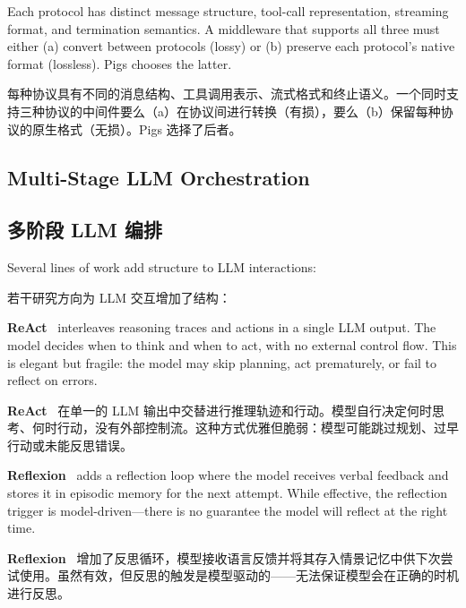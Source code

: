 Each protocol has distinct message structure, tool-call representation, streaming format, and termination semantics. A middleware that supports all three must either (a) convert between protocols (lossy) or (b) preserve each protocol's native format (lossless). Pigs chooses the latter.
\begin{chinese}
每种协议具有不同的消息结构、工具调用表示、流式格式和终止语义。一个同时支持三种协议的中间件要么（a）在协议间进行转换（有损），要么（b）保留每种协议的原生格式（无损）。Pigs 选择了后者。
\end{chinese}

\subsection{Multi-Stage LLM Orchestration}
\begin{chinese}
\subsection{多阶段 LLM 编排}
\end{chinese}

Several lines of work add structure to LLM interactions:
\begin{chinese}
若干研究方向为 LLM 交互增加了结构：
\end{chinese}

\textbf{ReAct}~\citep{yao2022react} interleaves reasoning traces and actions in a single LLM output. The model decides when to think and when to act, with no external control flow. This is elegant but fragile: the model may skip planning, act prematurely, or fail to reflect on errors.
\begin{chinese}
\textbf{ReAct}~\citep{yao2022react} 在单一的 LLM 输出中交替进行推理轨迹和行动。模型自行决定何时思考、何时行动，没有外部控制流。这种方式优雅但脆弱：模型可能跳过规划、过早行动或未能反思错误。
\end{chinese}

\textbf{Reflexion}~\citep{shinn2023reflexion} adds a reflection loop where the model receives verbal feedback and stores it in episodic memory for the next attempt. While effective, the reflection trigger is model-driven---there is no guarantee the model will reflect at the right time.
\begin{chinese}
\textbf{Reflexion}~\citep{shinn2023reflexion} 增加了反思循环，模型接收语言反馈并将其存入情景记忆中供下次尝试使用。虽然有效，但反思的触发是模型驱动的——无法保证模型会在正确的时机进行反思。
\end{chinese}

